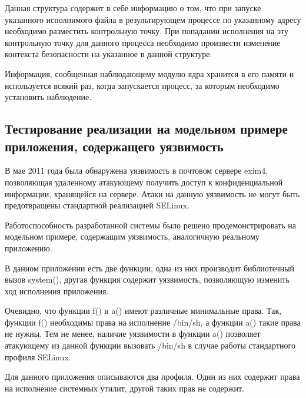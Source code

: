 

Данная структура содержит в себе информацию о том, что при запуске
указанного исполнимого файла в результирующем процессе по указанному
адресу необходимо разместить контрольную точку. При попадании
исполнения на эту контрольную точку для данного процесса необходимо
произвести изменение контекста безопасности на указанное в данной структуре.

Информация, сообщенная наблюдающему модулю ядра хранится в его памяти
и используется всякий раз, когда запускается процесс, за которым необходимо
установить наблюдение.

\subsection{Тестирование реализации на модельном примере приложения,
                содержащего уязвимость}

В мае 2011 года была обнаружена уязвимость в почтовом сервере
exim4, позволяющая удаленному атакующему получить доступ к конфиденциальной
информации, хранящейся на сервере. Атаки на данную уязвимость не могут
быть предотвращены стандартной реализацией SELinux.

Работоспособность разработанной системы было решено продемонстрировать
на модельном примере, содержащим уязвимость, аналогичную реальному приложению.

В данном приложении есть две функции, одна из них производит
библиотечный вызов system(), другая функция содержит уязвимость,
позволяющую изменить ход исполнения приложения.



Очевидно, что функции f() и a() имеют различные минимальные права.
Так, функции f() необходимы права на исполнение /bin/sh, а функции
a() такие права не нужны. Тем не менее, наличие уязвимости в функции
a() позволяет атакующему из данной функции вызовать /bin/sh в случае
работы стандартного профиля SELinux.

Для данного приложения описываются два профиля. Один из них содержит
права на исполнение системных утилит, другой таких прав не содержит.







